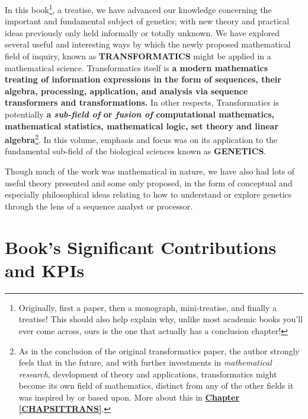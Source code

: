 \documentclass[a4paper, 18pt]{book} %
\begin{document}
In this book\footnote{Originally, first a paper, then a monograph, mini-treatise, and finally a treatise! This should also help explain why, unlike most academic books you'll ever come across, ours is the one that actually has a conclusion chapter!}, a treatise, we have advanced our knowledge concerning the important and fundamental subject of genetics; with new theory and practical ideas previously only held informally or totally unknown. We have explored several useful and interesting ways by which the newly proposed mathematical field of inquiry, known as \textbf{TRANSFORMATICS} might be applied in a mathematical science. Transformatics itself is \textbf{a modern mathematics treating of information expressions in the form of sequences, their algebra, processing, application, and analysis via sequence transformers and transformations.}  In other respects, Transformatics is potentially \textbf{a \textit{sub-field of} or \textit{fusion of} computational mathematics, mathematical statistics, mathematical logic, set theory and linear algebra}\footnote{As in the conclusion of the original transformatics paper\cite{transformatics}, the author strongly feels that in the future, and with further investments in \textit{mathematical research}, development of theory and applications, transformatics might become its own field of mathematics, distinct from any of the other fields it was inspired by or based upon. More about this in \textbf{\hyperref[CHAPSITTRANS]{Chapter \ref{CHAPSITTRANS}}}.}. In this volume, emphasis and focus was on its application to the fundamental sub-field of the biological sciences known as \textbf{GENETICS}. 

Though much of the work was mathematical in nature, we have also had lots of useful theory presented and some only proposed, in the form of conceptual and especially philosophical ideas relating to how to understand or explore genetics through the lens of a sequence analyst or processor. 

\section{Book's Significant Contributions and KPIs}
\label{SECKPIS}
\end{document}

